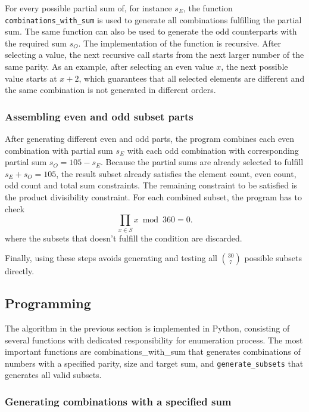 \documentclass[11pt,a4paper]{article}
\begin{document}
For every possible partial sum of, for instance $s_E$, the function \texttt{combinations\_with\_sum} is used to generate all combinations fulfilling the partial sum. The same function can also be used to generate the odd counterparts with the required sum $s_O$. The implementation of the function is recursive. After selecting a value, the next recursive call starts from the next larger number of the same parity. As an example, after selecting an even value $x$, the next possible value starts at $x+2$, which guarantees that all selected elements are different and the same combination is not generated in different orders.

\subsubsection*{Assembling even and odd subset parts}

After generating different even and odd parts, the program combines each even combination with partial sum $s_E$ with each odd combination with corresponding partial sum $s_O = 105 - s_E$. Because the partial sums are already selected to fulfill $s_E + s_O = 105$, the result subset already satisfies the element count, even count, odd count and total sum constraints. The remaining constraint to be satisfied is the product divisibility constraint. For each combined subset, the program has to check
\[
\prod_{x\in S} x \bmod 360 = 0.
\]
where the subsets that doesn't fulfill the condition are discarded.

Finally, using these steps avoids generating and testing all $\binom{30}{7}$ possible subsets directly.

\subsection*{Programming}

The algorithm in the previous section is implemented in Python, consisting of several functions with dedicated responsibility for enumeration process. The most important functions are {combinations\_with\_sum} that generates combinations of numbers with a specified parity, size and target sum, and \texttt{generate\_subsets} that generates all valid subsets.

\subsubsection*{Generating combinations with a specified sum}
\end{document}
